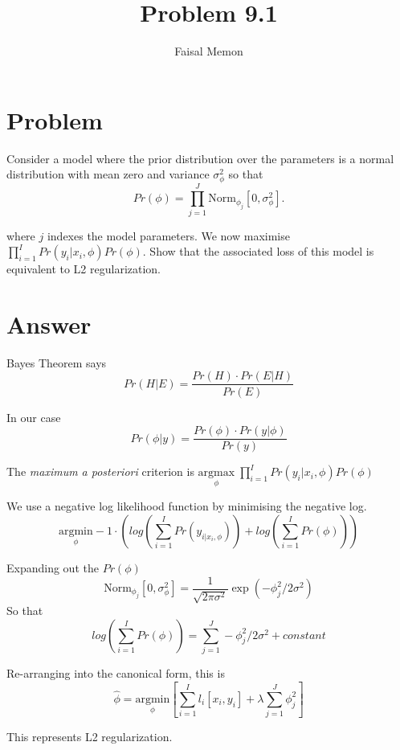 \documentclass{article}
\title{Problem 9.1}
\author{Faisal Memon}
\begin{document}
\maketitle

\section{Problem}

Consider a model where the prior distribution over the parameters is a normal distribution with mean zero and variance $ \sigma_{\phi}^{2} $ so that
\begin{equation*}
   Pr(\phi) = \prod_{j=1}^{J} \text{Norm}_{\phi_{j}}[0, \sigma_{\phi}^{2}].
\end{equation*}

where $ j $ indexes the model parameters.  We now maximise $ \prod_{i=1}^{I} Pr(y_{i} | x_{i},\phi)Pr(\phi) $.  Show that the associated loss of this model is equivalent to L2 regularization.

\section{Answer} 

Bayes Theorem says
\begin{equation*}
   Pr(H|E) = \frac{Pr(H) \cdot Pr(E|H)}{Pr(E)}
\end{equation*}

In our case
\begin{equation*}
   Pr( \phi | y) = \frac{Pr(\phi) \cdot Pr(y | \phi)}{Pr(y)}   
\end{equation*}

The \textit{maximum a posteriori}  criterion is $ \underset{\phi}{\mathrm{argmax}}  \;  \prod_{i=1}^{I} Pr(y_{i} | x_{i},\phi)Pr(\phi)$

We use a negative log likelihood function by minimising the negative log.
\begin{equation*}
   \underset{\phi}{\mathrm{argmin}} -1 \cdot \left( log \left(\sum_{i=1}^{I}Pr(y_{i|x_{i}, \phi}) \right) + log \left(\sum_{i=1}^{I} Pr(\phi)   \right) \right)
\end{equation*}

Expanding out the $ Pr(\phi) $
\begin{equation*}
   \text{Norm}_{\phi_{j}}[0, \sigma_{\phi}^{2}] = \frac{1}{\sqrt{2 \pi \sigma^{2}}} \exp (- \phi_{j}^{2}/2\sigma^{2})
\end{equation*}
So that
\begin{equation*}
   log \left(\sum_{i=1}^{I} Pr(\phi)   \right) = \sum_{j=1}^{J} - \phi_{j}^{2}/2\sigma^{2} + constant
\end{equation*}

Re-arranging into the canonical form, this is
\begin{equation*}
   \hat{\phi} = \underset{\phi}{\mathrm{argmin}} \left[  \sum_{i=1}^{I} l_{i}[x_{i}, y_{i}] + \lambda \sum_{j=1}^{J} \phi_{j}^{2}  \right]
\end{equation*}

This represents L2 regularization.
\end{document}

